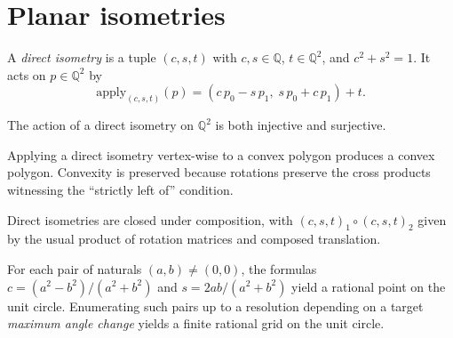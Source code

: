 \chapter{Planar isometries}

\begin{definition}
  \label{def:direct-isometry}
  \leanok
  A \emph{direct isometry} is a tuple $(c, s, t)$ with $c, s \in \mathbb{Q}$,
  $t \in \mathbb{Q}^2$, and $c^2 + s^2 = 1$. It acts on $p \in \mathbb{Q}^2$
  by
  \[
    \mathrm{apply}_{(c,s,t)}(p) = (c\,p_0 - s\,p_1,\; s\,p_0 + c\,p_1) + t.
  \]
\end{definition}

\begin{lemma}
  \label{lem:isometry-bijective}
  \leanok
  The action of a direct isometry on $\mathbb{Q}^2$ is both injective and
  surjective.
\end{lemma}

\begin{definition}
  \label{def:applyPolygon}
  \leanok
  Applying a direct isometry vertex-wise to a convex polygon produces a
  convex polygon. Convexity is preserved because rotations preserve the
  cross products witnessing the ``strictly left of'' condition.
\end{definition}

\begin{definition}
  \label{def:isometry-compose}
  \leanok
  Direct isometries are closed under composition, with
  $(c, s, t)_1 \circ (c, s, t)_2$ given by the usual product of rotation
  matrices and composed translation.
\end{definition}

\begin{definition}
  \label{def:angleGrid}
  \leanok
  For each pair of naturals $(a, b) \ne (0, 0)$, the formulas
  $c = (a^2 - b^2)/(a^2 + b^2)$ and $s = 2ab/(a^2 + b^2)$ yield a rational
  point on the unit circle. Enumerating such pairs up to a resolution
  depending on a target \emph{maximum angle change} yields a finite
  rational grid on the unit circle.
\end{definition}

